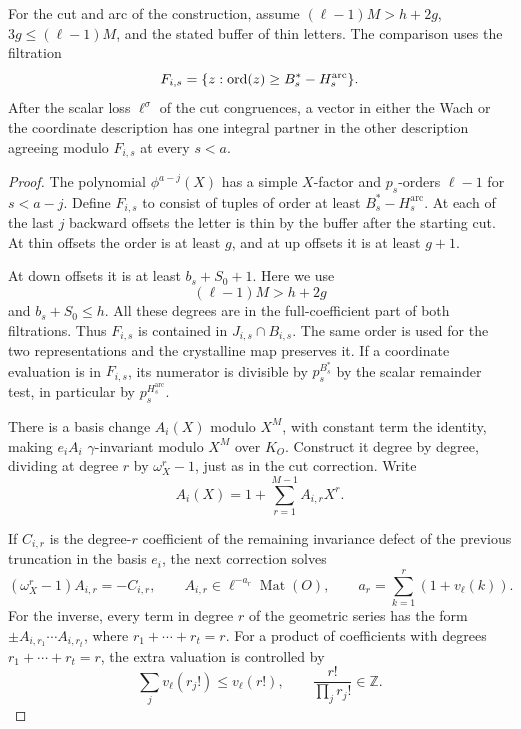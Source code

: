 \begin{lemma}\label{lem:wach-arc-partners}
For the cut and arc of the construction, assume \((\ell-1)M>h+2g\),
\(3g\le(\ell-1)M\), and the stated buffer of thin letters.
The comparison uses the filtration
\[
 F_{i,s}=\{z:\operatorname{ord}(z)\ge B_s^*-H_s^{\rm arc}\}.
\] After the scalar loss \(\ell^\sigma\)
of the cut congruences, a vector in either the Wach or the coordinate
description has one integral partner in the other description
agreeing modulo \(F_{i,s}\) at every \(s<a\).
\end{lemma}

\begin{proof}
The polynomial \(\phi^{a-j}(X)\) has a simple \(X\)-factor and
\(p_s\)-orders \(\ell-1\) for \(s<a-j\). Define \(F_{i,s}\)
to consist of tuples of order at least \(B_s^*-H_s^{\mathrm{arc}}\).
At each of the last \(j\) backward offsets the letter is thin
by the buffer after the starting cut. At thin offsets the order
is at least \(g\), and at up offsets it is at least \(g+1\).

At down offsets it is at least \(b_s+S_0+1\).
Here we use
\[
 (\ell-1)M>h+2g
\]
and \(b_s+S_0\le h\).
All these degrees are in the full-coefficient part of
both filtrations. Thus \(F_{i,s}\) is contained in
\(J_{i,s}\cap B_{i,s}\). The same order is used for the two
representations and the crystalline map preserves it.
If a coordinate evaluation is in \(F_{i,s}\), its
numerator is divisible by \(p_s^{B_s^*}\) by the scalar
remainder test, in particular by \(p_s^{H_s^{\mathrm{arc}}}\).

There is a basis change \(A_i(X)\) modulo \(X^M\), with
constant term the identity, making \(e_i A_i\)
\(\gamma\)-invariant modulo \(X^M\) over \(K_O\).
Construct it degree by degree, dividing at degree \(r\) by
\(\omega_X^r-1\), just as in the cut correction.
Write
\[
 A_i(X)=1+\sum_{r=1}^{M-1}A_{i,r}X^r.
\]

If \(C_{i,r}\) is the degree-\(r\) coefficient of the remaining
invariance defect of the previous truncation in the basis \(e_i\),
the next correction solves
\[
  (\omega_X^r-1)A_{i,r}=-C_{i,r},\qquad
  A_{i,r}\in\ell^{-a_r}\operatorname{Mat}(O),\qquad
  a_r=\sum_{k=1}^r(1+v_\ell(k)).
\]
For the inverse, every term in degree \(r\) of the geometric series
has the form \(\pm A_{i,r_1}\cdots A_{i,r_t}\), where
\(r_1+\cdots+r_t=r\). For a product of coefficients with degrees \(r_1+\cdots+r_t=r\), the extra valuation is controlled by
\[
 \sum_j v_\ell(r_j!)\le v_\ell(r!),\qquad \frac{r!}{\prod_j r_j!}\in\mathbb Z.
\]


\end{proof}
